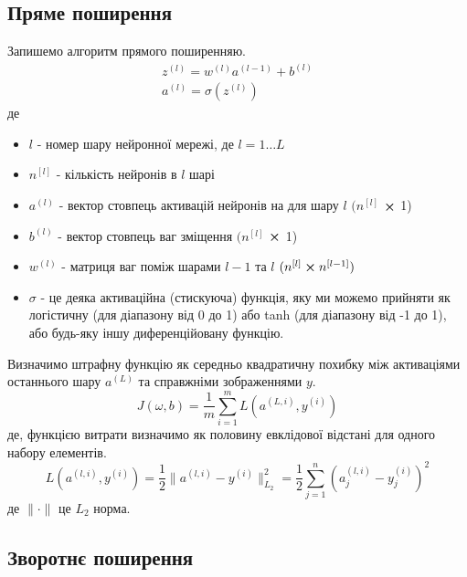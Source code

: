 \documentclass[14pt,a4paper]{extarticle}
\newcounter{e}
\numberwithin{equation}{section}
\numberwithin{figure}{section}
\newcommand{\ith}{^{(i)}}
\newcommand{\lth}{^{(l)}}
\begin{document}
	\subsection{Пряме поширення}
	Запишемо алгоритм прямого поширенняю.
	\begin{equation}
		\label{dnn-forward-propagation}
		\begin{array}{l}
			\displaystyle
			z\lth=w^{(l)} a^{(l-1)}+b\lth
			\\[0.7cm]
			
			\displaystyle
			a\lth=\sigma (z\lth)
		\end{array}
	\end{equation}
	де
	\begin{itemize}
		\item $l$ - номер шару нейронної мережі, де $l = 1 \dotsc L$
		\item $n^{[l]}$ - кількість нейронів в $l$ шарі
		\item $a\lth$ - вектор стовпець активацій нейронів на для шару $l$ $(n^{[l]}$ $\cross$ 1)
		\item $b\lth$ - вектор стовпець ваг зміщення $(n^{[l]}$ $\cross$ 1)
		\item $w\lth$ - матриця ваг поміж шарами $l-1$ та $l$ $(n^{[l]} \cross n^{[l - 1]})$ 
		\item $\sigma$ - це деяка активаційна (стискуюча) функція, яку ми можемо прийняти як логістичну (для діапазону від 0 до 1) або tanh (для діапазону від -1 до 1), або будь-яку іншу диференційовану функцію.
	\end{itemize}
	
	Визначимо штрафну функцію як середньо квадратичну похибку між активаціями останнього шару $a^{(L)}$ та справжніми зображеннями $y$.
	\begin{equation}
		\label{cost-function}
		J(\omega, b) =  \frac{1}{m}  \sum_{i=1}^{m} L(a^{(L, i)}, y\ith)
	\end{equation}
	де, функцією витрати визначимо як половину евклідової відстані для одного набору елементів.
	\begin{equation}
		\label{loss-function}
		L(a^{(l, i)}, y\ith)  =  \frac{1}{2}  \| a^{(l, i)}  - y\ith \|_{L_2}^{2} = \frac{1}{2} \sum_{j=1}^{n}  (a^{(l, i)}_j -  y\ith_j)^2
	\end{equation}
	де $\| \cdot \|$ це $L_2$ норма.

	\subsection{Зворотнє поширення}
	
\end{document}
